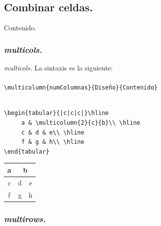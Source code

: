 \documentclass[dvipsnames,xcolor, handout]{beamer}
\theoremstyle{plain}
\theoremstyle{definition}
\begin{document}
\subsection{Combinar celdas.}
\begin{frame}{Contenido.}
\begin{multicols}{2}
  \tableofcontents[currentsubsection]
\end{multicols}
\end{frame}

\subsubsection*{\itshape multicols.}

\begin{frame}[fragile]{\itshape multicols.}
    La sintaxis es la siguiente:\\~\\
    \verb!\multicolumn{numColumnas}{Diseño}{Contenido}! \pause \\~\\
    \begin{minipage}{0.6\linewidth}
    \begin{small}
\begin{verbatim}
\begin{tabular}{|c|c|c|}\hline
     a & \multicolumn{2}{c}{b}\\ \hline
     c & d & e\\ \hline
     f & g & h\\ \hline
\end{tabular}
\end{verbatim}
    \end{small}
    \end{minipage}\pause
    \begin{minipage}{0.3\linewidth}
    \centering
\begin{tabular}{|c|c|c|}\hline
     a & \multicolumn{2}{c}{b}  \\ \hline
     c & d & e\\ \hline
     f & g & h\\ \hline
\end{tabular}
    \end{minipage}
    
\end{frame}

\subsubsection*{\itshape multirows.}
\end{document}
